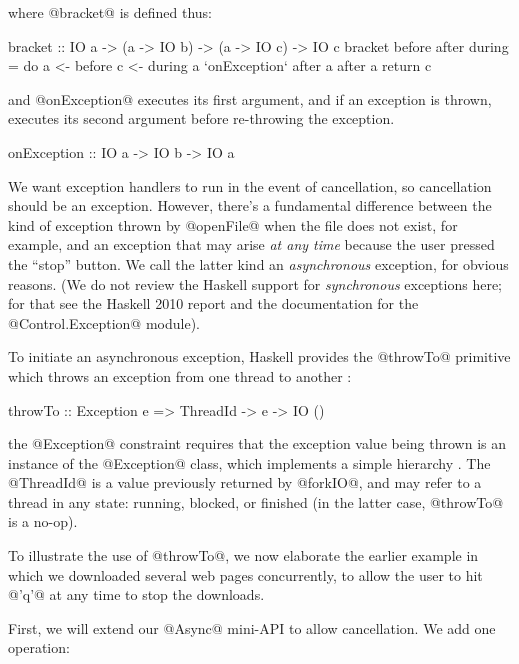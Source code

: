 \noindent where @bracket@ is defined thus:

\begin{haskell}
bracket :: IO a -> (a -> IO b) -> (a -> IO c) -> IO c
bracket before after during = do
  a <- before
  c <- during a `onException` after a
  after a
  return c
\end{haskell}

\noindent and @onException@ executes its first argument, and if an
exception is thrown, executes its second argument before re-throwing
the exception.

\begin{haskell}
onException :: IO a -> IO b -> IO a
\end{haskell}

We want exception handlers to run in the event of cancellation, so
cancellation should be an exception.  However, there's a fundamental
difference between the kind of exception thrown by @openFile@ when the
file does not exist, for example, and an exception that may arise
\emph{at any time} because the user pressed the ``stop'' button.  We
call the latter kind an \emph{asynchronous} exception, for obvious
reasons.  (We do not review the Haskell support for \emph{synchronous}
exceptions here; for that see the Haskell 2010 report
\cite{haskell2010} and the documentation for the @Control.Exception@
module).

To initiate an asynchronous exception, Haskell provides the @throwTo@
primitive which throws an exception from one thread to
another \cite{spj:asynch-exceptions}:

\begin{haskell}
throwTo :: Exception e => ThreadId -> e -> IO ()
\end{haskell}

\noindent the @Exception@ constraint requires that the exception value
being thrown is an instance of the @Exception@ class, which implements
a simple hierarchy \cite{extensible-exceptions}.  The @ThreadId@ is a
value previously returned by @forkIO@, and may refer to a thread in
any state: running, blocked, or finished (in the latter case,
@throwTo@ is a no-op).

To illustrate the use of @throwTo@, we now elaborate the earlier
example in which we downloaded several web pages concurrently, to
allow the user to hit @'q'@ at any time to stop the downloads.

First, we will extend our @Async@ mini-API to allow cancellation.  We
add one operation:


